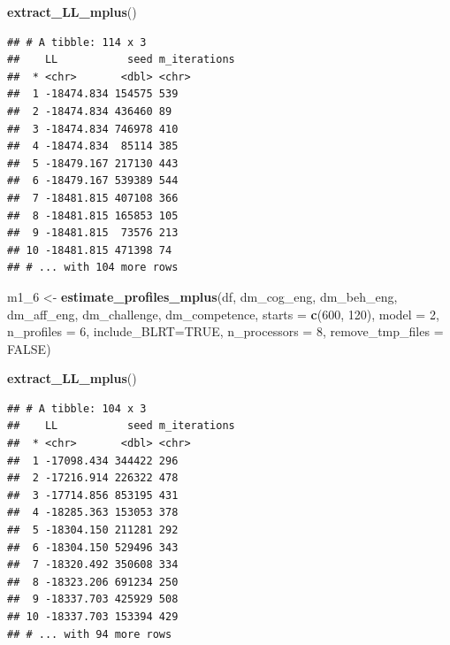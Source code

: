 \documentclass[]{msu-thesis}
\newenvironment{Shaded}{\begin{snugshade}}{\end{snugshade}}
\newcommand{\KeywordTok}[1]{\textcolor[rgb]{0.13,0.29,0.53}{\textbf{#1}}}
\newcommand{\DataTypeTok}[1]{\textcolor[rgb]{0.13,0.29,0.53}{#1}}
\newcommand{\DecValTok}[1]{\textcolor[rgb]{0.00,0.00,0.81}{#1}}
\newcommand{\StringTok}[1]{\textcolor[rgb]{0.31,0.60,0.02}{#1}}
\newcommand{\OtherTok}[1]{\textcolor[rgb]{0.56,0.35,0.01}{#1}}
\newcommand{\NormalTok}[1]{#1}
\theoremstyle{definition}
\theoremstyle{definition}
\theoremstyle{definition}
\theoremstyle{remark}
\begin{document}
\begin{Shaded}
\begin{Highlighting}[]
\KeywordTok{extract_LL_mplus}\NormalTok{()}
\end{Highlighting}
\end{Shaded}

\begin{verbatim}
## # A tibble: 114 x 3
##    LL           seed m_iterations
##  * <chr>       <dbl> <chr>       
##  1 -18474.834 154575 539         
##  2 -18474.834 436460 89          
##  3 -18474.834 746978 410         
##  4 -18474.834  85114 385         
##  5 -18479.167 217130 443         
##  6 -18479.167 539389 544         
##  7 -18481.815 407108 366         
##  8 -18481.815 165853 105         
##  9 -18481.815  73576 213         
## 10 -18481.815 471398 74          
## # ... with 104 more rows
\end{verbatim}

\begin{Shaded}
\begin{Highlighting}[]
\NormalTok{m1_}\DecValTok{6}\NormalTok{ <-}\StringTok{ }\KeywordTok{estimate_profiles_mplus}\NormalTok{(df,  }
\NormalTok{                             dm_cog_eng, dm_beh_eng, dm_aff_eng, dm_challenge, dm_competence,}
                             \DataTypeTok{starts =} \KeywordTok{c}\NormalTok{(}\DecValTok{600}\NormalTok{, }\DecValTok{120}\NormalTok{),}
                             \DataTypeTok{model =} \DecValTok{2}\NormalTok{,}
                             \DataTypeTok{n_profiles =} \DecValTok{6}\NormalTok{,}
                             \DataTypeTok{include_BLRT=}\OtherTok{TRUE}\NormalTok{,}
                             \DataTypeTok{n_processors =} \DecValTok{8}\NormalTok{, }\DataTypeTok{remove_tmp_files =} \OtherTok{FALSE}\NormalTok{)}

\KeywordTok{extract_LL_mplus}\NormalTok{()}
\end{Highlighting}
\end{Shaded}

\begin{verbatim}
## # A tibble: 104 x 3
##    LL           seed m_iterations
##  * <chr>       <dbl> <chr>       
##  1 -17098.434 344422 296         
##  2 -17216.914 226322 478         
##  3 -17714.856 853195 431         
##  4 -18285.363 153053 378         
##  5 -18304.150 211281 292         
##  6 -18304.150 529496 343         
##  7 -18320.492 350608 334         
##  8 -18323.206 691234 250         
##  9 -18337.703 425929 508         
## 10 -18337.703 153394 429         
## # ... with 94 more rows
\end{verbatim}
\end{document}
